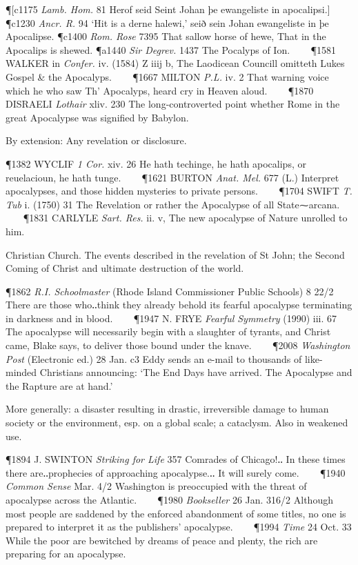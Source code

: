 \begin{description}[wide, labelwidth=!, labelindent=0pt]
\begin{myenumerate}
\P [c1175 \textit{Lamb. Hom.} 81 Herof seid Seint Johan þe ewangeliste in apocalipsi.]
\P c1230 \textit{Ancr. R.} 94 ‘Hit is a derne halewi,’ seið sein Johan ewangeliste in þe Apocalipse.
\P c1400 \textit{Rom. Rose} 7395 That sallow horse of hewe, That in the Apocalips is shewed.
\P a1440 \textit{Sir Degrev.} 1437 The  Pocalyps of Ion.    
\P 1581 WALKER in \textit{Confer.} iv. (1584) Z iiij b, The Laodicean Councill omitteth Lukes Gospel \& the Apocalyps.    
\P 1667 MILTON  \textit{P.L.} iv. 2 That warning voice which he who saw Th' Apocalyps, heard cry in Heaven aloud.    
\P 1870 DISRAELI  \textit{Lothair} xliv. 230 The long-controverted point whether Rome in the great Apocalypse was signified by Babylon.

 By extension: Any revelation or disclosure.

\P 1382 WYCLIF  \textit{1 Cor.} xiv. 26 He hath techinge, he hath apocalips, or reuelacioun, he hath tunge.    
\P 1621 BURTON  \textit{Anat. Mel.} 677 (L.) Interpret apocalypses, and those hidden mysteries to private persons.    
\P 1704 SWIFT  \textit{T. Tub} i. (1750) 31 The Revelation or rather the Apocalypse of all State⁓arcana.    
\P 1831 CARLYLE  \textit{Sart. Res.} ii. v, The new apocalypse of Nature unrolled to him.


 Christian Church. The events described in the revelation of St John; the Second Coming of Christ and ultimate destruction of the world.

\P 1862 \textit{R.I. Schoolmaster} (Rhode Island Commissioner Public Schools) 8 22/2 There are those who‥think they already behold its fearful apocalypse terminating in darkness and in blood.    
\P 1947 N. FRYE  \textit{Fearful Symmetry} (1990) iii. 67 The apocalypse will necessarily begin with a slaughter of tyrants, and Christ came, Blake says, to deliver those bound under the knave.    
\P 2008 \textit{Washington Post} (Electronic ed.) 28 Jan. c3 Eddy sends an e-mail to thousands of like-minded Christians announcing: ‘The End Days have arrived. The Apocalypse and the Rapture are at hand.’

 More generally: a disaster resulting in drastic, irreversible damage to human society or the environment, esp. on a global scale; a cataclysm. Also in weakened use.

\P 1894 J. SWINTON  \textit{Striking for Life} 357 Comrades of Chicago!‥ In these times there are‥prophecies of approaching apocalypse.‥ It will surely come.    
\P 1940 \textit{Common  Sense} Mar. 4/2 Washington is preoccupied with the threat of apocalypse across the Atlantic.    
\P 1980 \textit{Bookseller}  26 Jan. 316/2 Although most people are saddened by the enforced abandonment of some titles, no one is prepared to interpret it as the publishers' apocalypse.    
\P 1994 \textit{Time}  24 Oct. 33 While the poor are bewitched by dreams of peace and plenty, the rich are preparing for an apocalypse.
\end{myenumerate}



\end{description}
